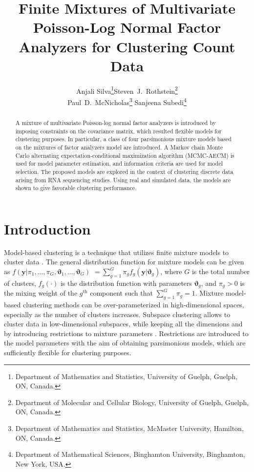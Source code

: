 \documentclass[12pt]{article}
\begin{document}
\title{Finite Mixtures of Multivariate Poisson-Log Normal Factor Analyzers for Clustering Count Data}

\author{Anjali Silva\footnote{Department of Mathematics and Statistics, University of Guelph, Guelph, ON, Canada.}\qquad\qquad\qquad Steven~J.~Rothstein\footnote{Department of Molecular and Cellular Biology, University of Guelph, Guelph, ON, Canada.}\\\hspace{-0.4in}Paul~D.~McNicholas\footnote{Department of Mathematics and Statistics, McMaster University, Hamilton, ON, Canada.} \qquad\qquad Sanjeena Subedi\footnote{Department of Mathematical Sciences, Binghamton University, Binghamton, New York, USA.}}
\date{}

\maketitle

\begin{abstract}
A mixture of multivariate Poisson-log normal factor analyzers is introduced by imposing constraints on the covariance matrix, which resulted flexible models for clustering purposes. In particular, a class of four parsimonious mixture models based on the mixtures of factor analyzers model are introduced. A Markov chain Monte Carlo alternating expectation-conditional maximization algorithm (MCMC-AECM) is used for model parameter estimation, and information criteria are used for model selection. The proposed models are explored in the context of clustering discrete data arising from RNA sequencing studies. Using real and simulated data, the models are shown to give favorable clustering performance.
\end{abstract}

\section{Introduction}\label{sec:intro}
Model-based clustering is a technique that utilizes finite mixture models to cluster data  \citep{wolfe1965, mclachlanandbasford1998, mclachlan2000, mcnicholas2016}. The general distribution function for mixture models can be given as $f( \mathbf{y}| \pi_1, \ldots, \pi_G,\boldsymbol{\vartheta}_1, \ldots, \boldsymbol{\vartheta}_G )$ $= \sum_{g=1}^{G} \pi_g f_g( \mathbf{y} | \boldsymbol{\vartheta}_g)$, where $G$ is the total number of clusters, $f_g(\cdot)$ is the distribution function with parameters $\boldsymbol{\vartheta}_g$, and $ \pi_g>0$ is the mixing weight of the $g^{\text{th}}$ component such that $\sum_{g=1}^G\pi_g=1$. Mixture model-based clustering methods can be over-parameterized in high-dimensional spaces, especially as the number of clusters increases. Subspace clustering allows to cluster data in low-dimensional subspaces, while keeping all the dimensions and by introducing restrictions to mixture parameters \citep{bouveyron2012}. Restrictions are introduced to the model parameters with the aim of obtaining parsimonious models, which are sufficiently flexible for clustering purposes. 
\end{document}
